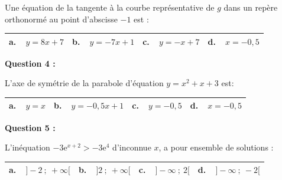 Une équation de la tangente à la courbe représentative de $g$ dans un repère orthonormé au point d'abscisse $- 1$ est :

\begin{center}
\begin{tabularx}{\linewidth}{|*{4}{X|}}\hline
\textbf{a.~~}$y=8x+7$&\textbf{b.~~}$y=-7 x+1$&\textbf{c.~~}$y= -x +7$&\textbf{d.~~}$x = - 0,5$\\ \hline
\end{tabularx}
\end{center}

\medskip

\textbf{Question 4 :}

\medskip

L'axe de symétrie de la parabole d'équation $y = x^2 + x + 3$ est:

\begin{center}
\begin{tabularx}{\linewidth}{|*{4}{X|}}\hline
\textbf{a.~~}$y =x$&\textbf{b.~~}$y=- 0,5x+1$&\textbf{c.~~}$y= -0,5$&\textbf{d.~~}$x = - 0,5$\\ \hline
\end{tabularx}
\end{center}

\medskip

\textbf{Question 5 :}

\medskip 

L'inéquation $-3\text{e}^{x+2} > - 3\text{e}^{4}$ d'inconnue $x$, a pour ensemble de solutions :

\begin{center}
\begin{tabularx}{\linewidth}{|*{4}{X|}}\hline
\textbf{a.~~}$]- 2~;~+ \infty[$&\textbf{b.~~}$]2~;~+ \infty[$&\textbf{c.~~}$]- \infty~;~2[$&\textbf{d.~~}$]- \infty~;~- 2[$\\ \hline
\end{tabularx}
\end{center}

\bigskip
